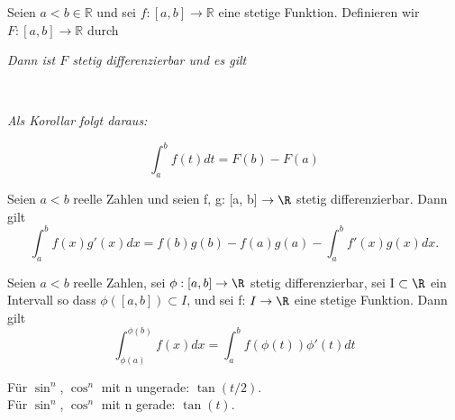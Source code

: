 \begin{theorem}

Seien $a<b \in \mathbb{R}$ und sei $f: [a,b]\rightarrow \mathbb{R}$ eine stetige Funktion. Definieren wir $F: [a,b]\rightarrow \mathbb{R}$ durch

	
	\raggedright{\textit{Dann ist $F$ stetig differenzierbar und es gilt}}
	
	\\
	
	
	\raggedright{\textit{Als Korollar folgt daraus:}}
	
	$$\int_{a}^{b} f(t)dt = F(b)- F(a)$$
\end{theorem}

\begin{theorem}

Seien $a < b$ reelle Zahlen 
und seien f, g: [a, b] $\rightarrow \R$ stetig differenzierbar. Dann gilt
$$\int_a^b f(x)g'(x)dx = f(b)g(b) - f(a)g(a) - \int_a^b f'(x)g(x)dx.$$
\end{theorem}

\begin{theorem}[Substitution]

Seien $a < b$ reelle Zahlen, sei $\phi : [a, b] \rightarrow \R$ stetig differenzierbar, sei I $\subset \R$ ein Intervall so dass $\phi([a, b]) \subset I$, und sei f: $I \rightarrow \R$ eine stetige Funktion. Dann gilt
$$\int_{\phi(a)}^{\phi(b)} f(x)dx = \int_a^b f(\phi(t))\phi'(t)dt$$
\end{theorem}

\begin{concept}
	Für $\sin^n$, $\cos^n$ mit n ungerade: $\tan{(t/2)}$.\\
    Für $\sin^n$, $\cos^n$ mit n gerade: $\tan{(t)}$.\\
\end{concept}


